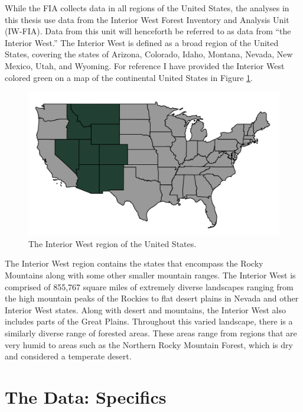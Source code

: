 \documentclass[12pt,twoside]{reedthesis}
\begin{document}
While the FIA collects data in all regions of the United States, the analyses in this thesis use data from the Interior West Forest Inventory and Analysis Unit (IW-FIA). Data from this unit will henceforth be referred to as data from ``the Interior West.'' The Interior West is defined as a broad region of the United States, covering the states of Arizona, Colorado, Idaho, Montana, Nevada, New Mexico, Utah, and Wyoming. For reference I have provided the Interior West colored green on a map of the continental United States in Figure \ref{fig:usa-map}.
\begin{figure}

{\centering \includegraphics[width=1\linewidth]{figure/interior-west-on-usa} 

}

\caption[The Interior West region of the United States]{The Interior West region of the United States.}\label{fig:usa-map}
\end{figure}
The Interior West region contains the states that encompass the Rocky Mountains along with some other smaller mountain ranges. The Interior West is comprised of 855,767 square miles of extremely diverse landscapes ranging from the high mountain peaks of the Rockies to flat desert plains in Nevada and other Interior West states. Along with desert and mountains, the Interior West also includes parts of the Great Plains. Throughout this varied landscape, there is a similarly diverse range of forested areas. These areas range from regions that are very humid to areas such as the Northern Rocky Mountain Forest, which is dry and considered a temperate desert.

\hypertarget{the-data-specifics}{%
\section{The Data: Specifics}\label{the-data-specifics}}
\end{document}
